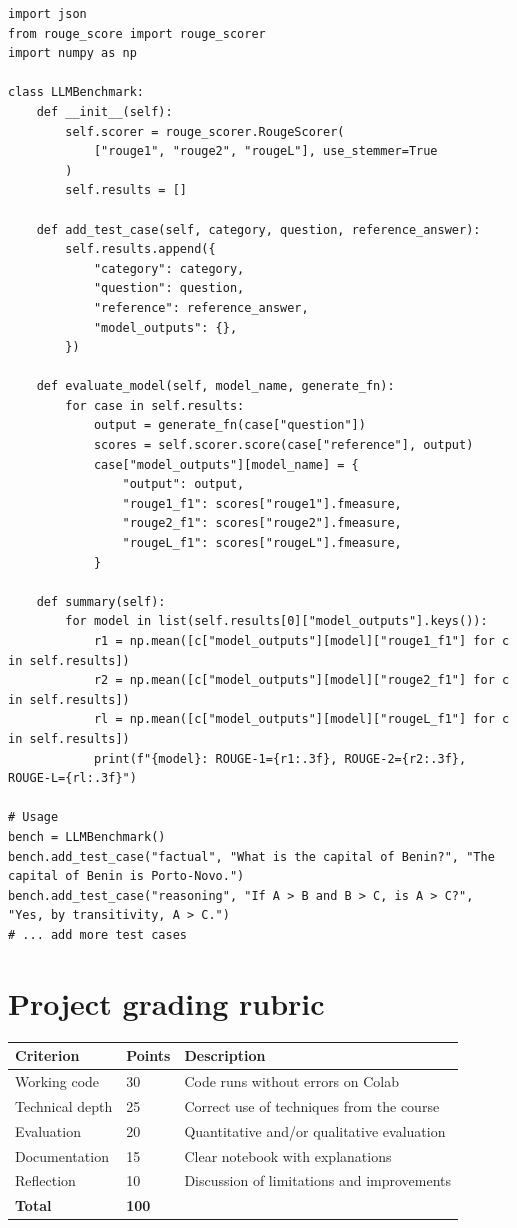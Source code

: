 \begin{verbatim}
import json
from rouge_score import rouge_scorer
import numpy as np

class LLMBenchmark:
    def __init__(self):
        self.scorer = rouge_scorer.RougeScorer(
            ["rouge1", "rouge2", "rougeL"], use_stemmer=True
        )
        self.results = []

    def add_test_case(self, category, question, reference_answer):
        self.results.append({
            "category": category,
            "question": question,
            "reference": reference_answer,
            "model_outputs": {},
        })

    def evaluate_model(self, model_name, generate_fn):
        for case in self.results:
            output = generate_fn(case["question"])
            scores = self.scorer.score(case["reference"], output)
            case["model_outputs"][model_name] = {
                "output": output,
                "rouge1_f1": scores["rouge1"].fmeasure,
                "rouge2_f1": scores["rouge2"].fmeasure,
                "rougeL_f1": scores["rougeL"].fmeasure,
            }

    def summary(self):
        for model in list(self.results[0]["model_outputs"].keys()):
            r1 = np.mean([c["model_outputs"][model]["rouge1_f1"] for c in self.results])
            r2 = np.mean([c["model_outputs"][model]["rouge2_f1"] for c in self.results])
            rl = np.mean([c["model_outputs"][model]["rougeL_f1"] for c in self.results])
            print(f"{model}: ROUGE-1={r1:.3f}, ROUGE-2={r2:.3f}, ROUGE-L={rl:.3f}")

# Usage
bench = LLMBenchmark()
bench.add_test_case("factual", "What is the capital of Benin?", "The capital of Benin is Porto-Novo.")
bench.add_test_case("reasoning", "If A > B and B > C, is A > C?", "Yes, by transitivity, A > C.")
# ... add more test cases
\end{verbatim}

\section{Project grading rubric}

\begin{longtable}{p{4cm}p{2cm}p{6.5cm}}
\toprule
\textbf{Criterion} & \textbf{Points} & \textbf{Description} \\
\midrule
Working code & 30 & Code runs without errors on Colab \\
Technical depth & 25 & Correct use of techniques from the course \\
Evaluation & 20 & Quantitative and/or qualitative evaluation \\
Documentation & 15 & Clear notebook with explanations \\
Reflection & 10 & Discussion of limitations and improvements \\
\midrule
\textbf{Total} & \textbf{100} & \\
\bottomrule
\end{longtable}

